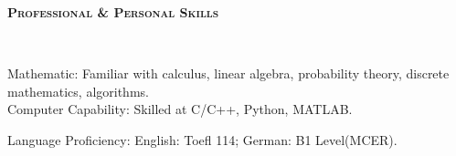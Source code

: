 \documentclass[a4paper]{article}
\newenvironment{changemargin}[2]{%
  \begin{list}{}{%
    \setlength{\topsep}{0pt}%
    \setlength{\leftmargin}{#1}%
    \setlength{\rightmargin}{#2}%
    \setlength{\listparindent}{\parindent}%
    \setlength{\itemindent}{\parindent}%
    \setlength{\parsep}{\parskip}%
  }%
  \item[]}{\end{list}
}
\newcommand{\lineover}{
	\begin{changemargin}{-0.05in}{-0.05in}
		\vspace*{-8pt}
		\hrulefill \\
		\vspace*{-2pt}
	\end{changemargin}
}
\newcommand{\header}[1]{
	\begin{changemargin}{-0.5in}{-0.5in}
		\scshape{\textbf{#1}}\\
  	\lineover
	\end{changemargin}
}
\newenvironment{body} {
	\vspace*{-16pt}
	\begin{changemargin}{-0.25in}{-0.5in}
  }	
	{\end{changemargin}
}
\begin{document}
\begin{body}

\end{body}
\smallskip
\smallskip


\header{Professional \& Personal Skills}

\begin{body}
	\vspace{14pt}
	Mathematic: Familiar with calculus, linear algebra, probability theory, discrete mathematics, algorithms.\\
	\smallskip
	Computer Capability: Skilled at C/C++, Python, MATLAB.\\
	\smallskip

	Language Proficiency: English: Toefl 114; German: B1 Level(MCER).\\
\end{body}
\smallskip
\smallskip






\end{document}

